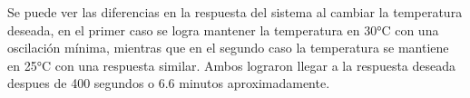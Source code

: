 \documentclass[spanish, a4paper, 11pt]{article}
\begin{document}
Se puede ver las diferencias en la respuesta del sistema al cambiar la temperatura deseada, en el primer caso se logra mantener la temperatura en 30°C con una oscilación mínima, mientras que en el segundo caso la temperatura se mantiene en 25°C con una respuesta similar.
Ambos lograron llegar a la respuesta deseada despues de 400 segundos o 6.6 minutos aproximadamente.
\end{document}
